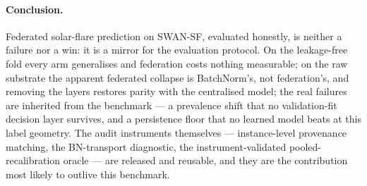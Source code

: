 \paragraph{Conclusion.}
Federated solar-flare prediction on SWAN-SF, evaluated honestly, is
neither a failure nor a win: it is a mirror for the evaluation
protocol. On the leakage-free fold every arm generalises and
federation costs nothing measurable; on the raw substrate the
apparent federated collapse is BatchNorm's, not federation's, and
removing the layers restores parity with the centralised model; the
real failures are inherited from the benchmark --- a prevalence
shift that no validation-fit decision layer survives, and a
persistence floor that no learned model beats at this label
geometry. The audit instruments themselves --- instance-level
provenance matching, the BN-transport diagnostic, the
instrument-validated pooled-recalibration oracle --- are released
and reusable, and they are the contribution most likely to outlive
this benchmark.
